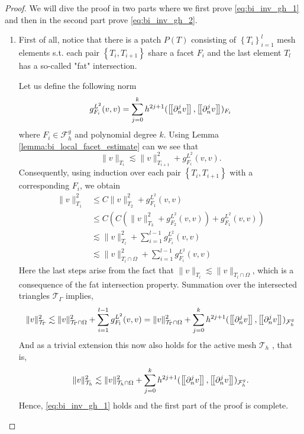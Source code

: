 \begin{proof}
    We will dive the proof in two parts where we first prove \eqref{eq:bi_inv_gh_1} and then in the second part prove \eqref{eq:bi_inv_gh_2}.
    \begin{enumerate}[label=\arabic*)]
        \item
            First of all, notice that there is a patch $P(T) $ consisting of $\left\{ T_{i} \right\}_{i=1}^{l} $ mesh elements s.t. each pair $ \left\{ T_{i}, T_{i+1} \right\} $ share a facet $F_{i}$ and the last element $T_{l}$ has a so-called "fat"
            intersection.

            Let us define the following norm \[
            g_{F_{i}}^{L^{2}}( v,v)  = \sum_{j=0}^{k} h^{2j+1}( \left[\!\left[  \partial ^{j}_{n}v  \right]\!\right], \left[\!\left[  \partial ^{j}_{n}v  \right]\!\right]    )_{F_{i} }
            \]
            where $F_{i} \in  \mathcal{F} ^{g}_{h}$ and polynomial degree $ k$. Using Lemma \ref{lemma:bi_local_facet_estimate} can we see that \[
            \| v \|_{ T_{i} }^{  } \lesssim \| v \|_{ T_{i+1} }^{ 2 } + g_{F_{i}}^{L^{2}}( v,v).
            \]
    Consequently, using induction over each pair $\left\{ T_{i}, T_{i+1} \right\} $ with a corresponding $F_{i}$, we obtain
            \[
                \begin{split}
            \| v \|_{ T_{1} }^{2  }  & \le  C \| v \|_{ T_{2} }^{ 2 } + g_{F_{1}}^{L^{2}}( v,v)\\
              & \le  C( C( \| v \|_{ T_{3} }^{ 2 } + g_{F_{2}}^{L^{2}}( v,v) ) + g_{F_{1}}^{L^{2}}( v,v) )\\
              & \lesssim    \| v \|_{ T_{l} }^{ 2 }  + \sum_{i=1}^{l-1} g_{F_{i}}^{L^{2}}( v,v)  \\
              & \lesssim    \| v \|_{ T_{l} \cap \Omega  }^{ 2 }  + \sum_{i=1}^{l-1} g_{F_{i}}^{L^{2}}( v,v)
                \end{split}
            \]
            Here the last steps arise from the fact that $\|  v \|_{ T_{l} }^{  } \lesssim  \|  v \|_{ T_{l} \cap \Omega  }^{  }  $, which is a consequence of the fat intersection property.
Summation over the intersected triangles $\mathcal{T} _{\Gamma }$ implies,
            \[
                    \| v \|_{ \mathcal{T} _{\Gamma } }^{2  } \lesssim \| v \|_{ \mathcal{T} _{\Gamma}\cap \Omega  }^{2  }+ \sum_{i=1}^{l-1} g_{F_{l}}^{L^{2}}( v,v) \\
                     = \| v \|_{ \mathcal{T}_{\Gamma } \cap \Omega   }^{ 2 }  + \sum_{j=0}^{k} h^{2j+1} ( \left[\!\left[  \partial ^{j}_{n} v  \right]\!\right], \left[\!\left[  \partial ^{j}_{n}v  \right]\!\right]    )_{\mathcal{F}_{h}^{g}}
        \]
        And as a trivial extension this now also holds for the active mesh $\mathcal{T} _{h}$ , that is, \[
                    \| v \|_{ \mathcal{T} _{h } }^{2  } \lesssim  \| v \|_{ \mathcal{T}_{h } \cap \Omega   }^{ 2 }  + \sum_{j=0}^{k} h^{2j+1} ( \left[\!\left[  \partial ^{j}_{n} v  \right]\!\right], \left[\!\left[  \partial ^{j}_{n}v  \right]\!\right]    )_{\mathcal{F}_{h}^{g}}.
        \]
        Hence, \eqref{eq:bi_inv_gh_1} holds and the first part of the proof is complete.


\end{enumerate}
\end{proof}

